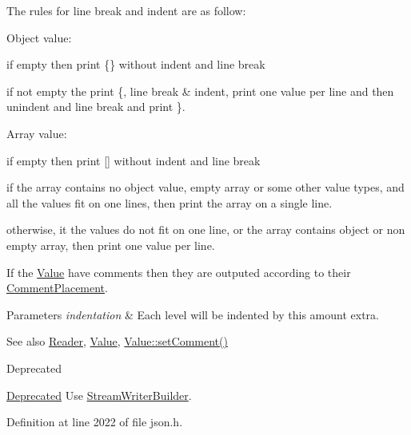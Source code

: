 The rules for line break and indent are as follow\+:
\begin{DoxyItemize}
\item Object value\+:
\begin{DoxyItemize}
\item if empty then print \{\} without indent and line break
\item if not empty the print \textquotesingle{}\{\textquotesingle{}, line break \& indent, print one value per line and then unindent and line break and print \textquotesingle{}\}\textquotesingle{}.
\end{DoxyItemize}
\item Array value\+:
\begin{DoxyItemize}
\item if empty then print \mbox{[}\mbox{]} without indent and line break
\item if the array contains no object value, empty array or some other value types, and all the values fit on one lines, then print the array on a single line.
\item otherwise, it the values do not fit on one line, or the array contains object or non empty array, then print one value per line.
\end{DoxyItemize}
\end{DoxyItemize}

If the \hyperlink{class_json_1_1_value}{Value} have comments then they are outputed according to their \hyperlink{namespace_json_a4fc417c23905b2ae9e2c47d197a45351}{Comment\+Placement}.


\begin{DoxyParams}{Parameters}
{\em indentation} & Each level will be indented by this amount extra. \\
\hline
\end{DoxyParams}
\begin{DoxySeeAlso}{See also}
\hyperlink{class_json_1_1_reader}{Reader}, \hyperlink{class_json_1_1_value}{Value}, \hyperlink{class_json_1_1_value_a29f3a30f7e5d3af6f38d57999bf5b480}{Value\+::set\+Comment()} 
\end{DoxySeeAlso}
\begin{DoxyRefDesc}{Deprecated}
\item[\hyperlink{deprecated__deprecated000010}{Deprecated}]Use \hyperlink{class_json_1_1_stream_writer_builder}{Stream\+Writer\+Builder}. \end{DoxyRefDesc}


Definition at line 2022 of file json.\+h.



